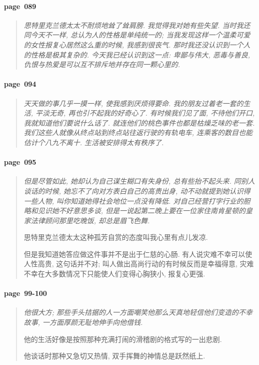 \paragraph*{page~089}
\begin{quotation}
    \itshape
    思特里克兰德太太不耐烦地耸了耸肩膀. 我觉得我对她有些失望. 当时我还同今天不一样, 总认为人的性格是单纯统一的; 当我发现这样一个温柔可爱的女性报复心居然这么重的时候, 我感到很丧气. 那时我还没认识到一个人的性格是极其复杂的. 今天我已经认识到这一点: 卑鄙与伟大, 恶毒与善良, 仇恨与热爱是可以互不排斥地并存在同一颗心里的. 
\end{quotation}

\paragraph*{page~094}
\begin{quotation}
    \itshape
    天天做的事几乎一摸一样, 使我感到厌烦得要命. 我的朋友过着老一套的生活, 平淡无奇, 再也引不起我的好奇心了. 有时候我们见了面, 不待他们开口, 我就知道他们要说什么话了. 就连他们的桃色事件也都是枯燥乏味的老一套. 我们这些人就像从终点站到终点站往返行驶的有轨电车, 连乘客的数目也能估计个八九不离十. 生活被安排得太有秩序了. 
\end{quotation}

\paragraph*{page~095}
\begin{quotation}
    \itshape
    但是尽管如此, 她却认为自己谋生糊口有失身份, 总有些抬不起头来. 同别人谈话的时候, 她忘不了向对方表白自己的高贵出身, 动不动就提到她认识得一些人物, 叫你知道她得社会地位一点没有降低. 对自己经营打字行业的胆略和见识她不好意思多谈, 但是一说起第二晚上要在一位家住南肯星顿的皇家法律顾问那里吃晚饭, 却总是眉飞色舞. 

    思特里克兰德太太这种孤芳自赏的态度叫我心里有点儿发凉. 

    但是我知道她答应做这件事并不是出于仁慈的心肠. 有人说灾难不幸可以使人性高贵, 这句话并不对; 叫人做出高尚行动的有时候反而是幸福得意, 灾难不幸在大多数情况下只能使人们变得心胸狭小, 报复心更强. 
\end{quotation}

\paragraph*{page~99-100}
\begin{quotation}
    \itshape
    他很大方; 那些手头拮据的人一方面嘲笑他那么天真地轻信他们变造的不幸故事, 一方面厚颜无耻地伸手向他借钱. 

    他的生活好像是按照那种充满打闹的滑稽剧的格式写的一出悲剧. 

    他谈话时那种又急切又热情, 双手挥舞的神情总是跃然纸上. 
\end{quotation}



